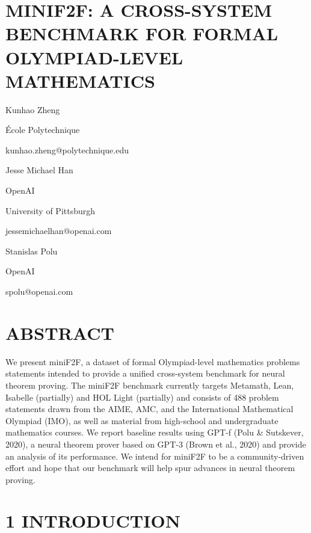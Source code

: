 \documentclass[
]{article}
\author{}
\date{}
\begin{document}
\section{MINIF2F: A CROSS-SYSTEM BENCHMARK FOR FORMAL OLYMPIAD-LEVEL
MATHEMATICS}\label{minif2f-a-cross-system-benchmark-for-formal-olympiad-level-mathematics}

Kunhao Zheng

École Polytechnique

kunhao.zheng@polytechnique.edu

Jesse Michael Han

OpenAI

University of Pittsburgh

jessemichaelhan@openai.com

Stanislas Polu

OpenAI

spolu@openai.com

\section{ABSTRACT}\label{abstract}

We present miniF2F, a dataset of formal Olympiad-level mathematics
problems statements intended to provide a unified cross-system benchmark
for neural theorem proving. The miniF2F benchmark currently targets
Metamath, Lean, Isabelle (partially) and HOL Light (partially) and
consists of 488 problem statements drawn from the AIME, AMC, and the
International Mathematical Olympiad (IMO), as well as material from
high-school and undergraduate mathematics courses. We report baseline
results using GPT-f (Polu \& Sutskever, 2020), a neural theorem prover
based on GPT-3 (Brown et al., 2020) and provide an analysis of its
performance. We intend for miniF2F to be a community-driven effort and
hope that our benchmark will help spur advances in neural theorem
proving.

\section{1 INTRODUCTION}\label{introduction}
\end{document}
